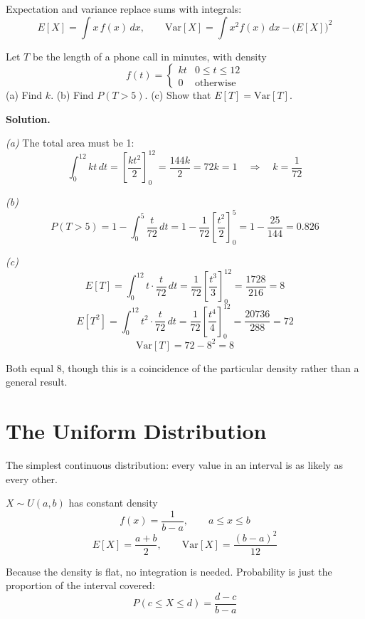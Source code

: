 \documentclass[a4paper,11pt]{article}
\begin{document}
\begin{keybox}
Expectation and variance replace sums with integrals:
\[ E[X] = \int x\,f(x)\,dx, \qquad
   \mathrm{Var}[X] = \int x^{2} f(x)\,dx - \big(E[X]\big)^{2} \]
\end{keybox}

\begin{example}
Let $T$ be the length of a phone call in minutes, with density
\[ f(t) = \begin{cases} kt & 0 \le t \le 12 \\ 0 & \text{otherwise} \end{cases} \]
(a) Find $k$. (b) Find $P(T > 5)$. (c) Show that $E[T] = \mathrm{Var}[T]$.

\medskip
\textbf{Solution.}

\emph{(a)} The total area must be 1:
\[ \int_{0}^{12} kt\,dt = \left[\frac{kt^{2}}{2}\right]_{0}^{12}
 = \frac{144k}{2} = 72k = 1 \quad\Longrightarrow\quad k = \frac{1}{72} \]

\emph{(b)}
\[ P(T > 5) = 1 - \int_{0}^{5}\frac{t}{72}\,dt
 = 1 - \frac{1}{72}\left[\frac{t^{2}}{2}\right]_{0}^{5}
 = 1 - \frac{25}{144} = 0.826 \]

\emph{(c)}
\[ E[T] = \int_{0}^{12} t\cdot\frac{t}{72}\,dt
 = \frac{1}{72}\left[\frac{t^{3}}{3}\right]_{0}^{12} = \frac{1728}{216} = 8 \]
\[ E[T^{2}] = \int_{0}^{12} t^{2}\cdot\frac{t}{72}\,dt
 = \frac{1}{72}\left[\frac{t^{4}}{4}\right]_{0}^{12} = \frac{20736}{288} = 72 \]
\[ \mathrm{Var}[T] = 72 - 8^{2} = 8 \]

Both equal 8, though this is a coincidence of the particular density rather than
a general result.
\end{example}

\section{The Uniform Distribution}

The simplest continuous distribution: every value in an interval is as likely as
every other.

\begin{keybox}
$X \sim U(a,b)$ has constant density
\[ f(x) = \frac{1}{b-a}, \qquad a \le x \le b \]
\[ E[X] = \frac{a+b}{2}, \qquad \mathrm{Var}[X] = \frac{(b-a)^{2}}{12} \]
\end{keybox}

Because the density is flat, no integration is needed. Probability is just the
proportion of the interval covered:
\[ P(c \le X \le d) = \frac{d-c}{b-a} \]
\end{document}
